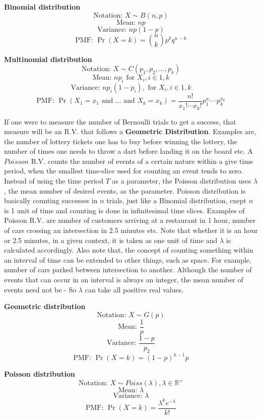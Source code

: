 	\begin{highlightedText}
		\textbf{Binomial  distribution} 
		\[ \text{Notation: }  X \sim B(n,p) \] 					
		\[ \text{Mean: } np \]  							
		\[ \text{Variance: } np(1-p) \] 						
		\[ \text{PMF: } \Pr(X=k) = \binom{n}{k} p^k q^{n-k} \] 
	 	
		\textbf{Multinomial distribution} 	
		\[ \text{Notation: } X \sim C(p_1, p_2, ..., p_k) \]	
		\[ \text{Mean: } np_i \text{ for } X_i, i \in {1,k} \]	
		\[ \text{Variance: } np_i(1-p_i), \text{ for } X_i, i \in {1,k} \]
		\[ \text{PMF: } \Pr(X_1 = x_1 \text{ and } \dots \text{ and } X_k = x_k) = \frac{n!}{x_1!\cdots x_k!} p_1^{x_1}  \cdots p_k^{x_k} \]
	\end{highlightedText}

If one were to measure the number of Bernoulli trials to get a success, that measure will be an R.V. that follows a \textbf{Geometric Distribution}. Examples are, the number of lottery tickets one has to buy before winning the lottery, the number of times one needs to throw a dart before landing it on the board etc. A $Poisson$ R.V. counts the number of events of a certain nature within a give time period, when the smallest time-slice used for counting an event tends to zero. Instead of using the time period $T$ as a parameter, the Poisson distribution uses $\lambda$, the mean number of desired events, as the parameter. Poisson distribution is basically counting successes in $n$ trials, just like a Binomial distribution, exept $n$ is 1 unit of time and counting is done in infinitesimal time slices. Examples of Poisson R.V. are number of customers arriving at a restaurant in 1 hour, number of cars crossing an intersection in 2.5 minutes etc. Note that whether it is an hour or 2.5 minutes, in a given context, it is taken as one unit of time and $\lambda$ is calculated accordingly. Also note that, the concept of counting something within an interval of time can be extended to other things, such as space. For example, number of cars parked between intersection to another. Although the number of events that can occur in an interval is always an integer, the mean number of events need not be - So $\lambda$ can take all positive real values.

	\begin{highlightedText}
		\textbf{Geometric  distribution} 
		\[ \text{Notation: }  X \sim G(p) \] 					
		\[ \text{Mean: } \frac{1}{p} \] 						
		\[ \text{Variance: } \frac{1-p}{p_2} \] 						
		\[ \text{PMF: } \Pr(X=k) =  (1-p)^{k-1}p \] 
	 	
		\textbf{Poisson distribution} 	
		\[ \text{Notation: } X \sim Poiss(\lambda), \lambda \in \mathbb{R}^+ \]	
		\[ \text{Mean: } \lambda \]	
		\[ \text{Variance: } \lambda \]
		\[ \text{PMF: } \Pr(X = k) = \frac{\lambda^k e^{-\lambda}}{k!} \]
	\end{highlightedText}

